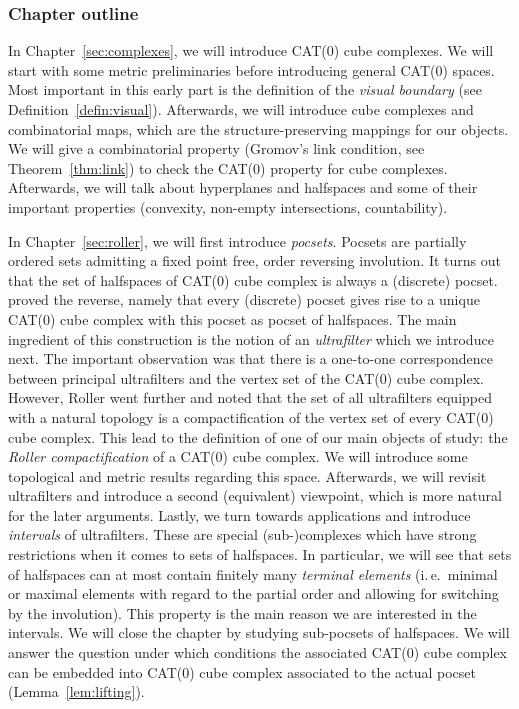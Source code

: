 \subsubsection*{Chapter outline}

In Chapter~\ref{sec:complexes}, we will introduce CAT(0) cube complexes. We will start with some metric preliminaries before introducing general CAT(0) spaces. Most important in this early part is the definition of the \emph{visual boundary} (see Definition~\ref{defin:visual}). Afterwards, we will introduce cube complexes and combinatorial maps, which are the structure-preserving mappings for our objects. We will give a combinatorial property (Gromov's link condition, see Theorem~\ref{thm:link}) to check the CAT(0) property for cube complexes. Afterwards, we will talk about hyperplanes and halfspaces and some of their important properties (convexity, non-empty intersections, countability).

In Chapter~\ref{sec:roller}, we will first introduce \emph{pocsets}. Pocsets are partially ordered sets admitting a fixed point free, order reversing involution. It turns out that the set of halfspaces of CAT(0) cube complex is always a (discrete) pocset. \textcite{Roller1999} proved the reverse, namely that every (discrete) pocset gives rise to a unique CAT(0) cube complex with this pocset as pocset of halfspaces. The main ingredient of this construction is the notion of an \emph{ultrafilter} which we introduce next. The important observation was that there is a one-to-one correspondence between principal ultrafilters and the vertex set of the CAT(0) cube complex. However, Roller went further and noted that the set of all ultrafilters equipped with a natural topology is a compactification of the vertex set of every CAT(0) cube complex. This lead to the definition of one of our main objects of study: the \emph{Roller compactification} of a CAT(0) cube complex. We will introduce some topological and metric results regarding this space. Afterwards, we will revisit ultrafilters and introduce a second (equivalent) viewpoint, which is more natural for the later arguments. Lastly, we turn towards applications and introduce \emph{intervals} of ultrafilters. These are special (sub-)complexes which have strong restrictions when it comes to sets of halfspaces. In particular, we will see that sets of halfspaces can at most contain finitely many \emph{terminal elements} (i.\,e.\ minimal or maximal elements with regard to the partial order and allowing for switching by the involution). This property is the main reason we are interested in the intervals. We will close the chapter by studying sub-pocsets of halfspaces. We will answer the question under which conditions the associated CAT(0) cube complex can be embedded into CAT(0) cube complex associated to the actual pocset (Lemma~\ref{lem:lifting}). 

